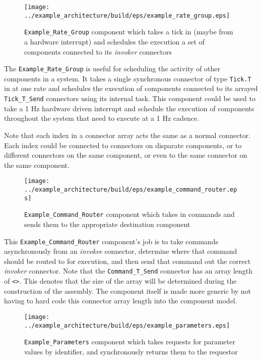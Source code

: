 \begin{figure}[H]
  \texttt{[image: ../example\_architecture/build/eps/example\_rate\_group.eps]}
  \caption{\texttt{Example\_Rate\_Group} component which takes a tick in (maybe from a hardware interrupt) and schedules the execution a set of components connected to its \textit{invoker} connectors}
\end{figure}

The \texttt{Example\_Rate\_Group} is useful for scheduling the activity of other components in a system. It takes a single synchronous connector of type \texttt{Tick.T} in at one rate and schedules the execution of components connected to its arrayed \texttt{Tick\_T\_Send} connectors using its internal task. This component could be used to take a 1 Hz hardware driven interrupt and schedule the execution of components throughout the system that need to execute at a 1 Hz cadence. 

Note that each index in a connector array acts the same as a normal connector. Each index could be connected to connectors on disparate components, or to different connectors on the same component, or even to the same connector on the same component.

\begin{figure}[H]
  \texttt{[image: ../example\_architecture/build/eps/example\_command\_router.eps]}
  \caption{\texttt{Example\_Command\_Router} component which takes in commands and sends them to the appropriate destination component}
\end{figure}

This \texttt{Example\_Command\_Router} component's job is to take commands asynchronously from an \textit{invokee} connector, determine where that command should be routed to for execution, and then send that command out the correct \textit{invoker} connector. Note that the \texttt{Command\_T\_Send} connector has an array length of \texttt{<>}. This denotes that the size of the array will be determined during the construction of the assembly. The component itself is made more generic by not having to hard code this connector array length into the component model.

\begin{figure}[H]
  \texttt{[image: ../example\_architecture/build/eps/example\_parameters.eps]}
  \caption{\texttt{Example\_Parameters} component which takes requests for parameter values by identifier, and synchronously returns them to the requestor}
\end{figure}

